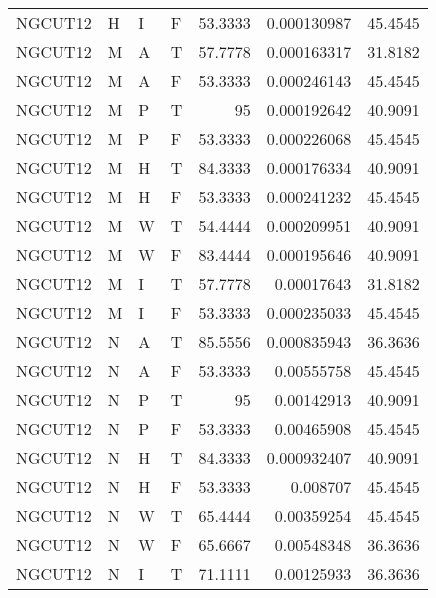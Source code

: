 \begin{longtable}{llllrrr}
    NGCUT12  & H         & I         & F          & 53.3333    & 0.000130987 & 45.4545  \\
    NGCUT12  & M         & A         & T          & 57.7778    & 0.000163317 & 31.8182  \\
    NGCUT12  & M         & A         & F          & 53.3333    & 0.000246143 & 45.4545  \\
    NGCUT12  & M         & P         & T          & 95         & 0.000192642 & 40.9091  \\
    NGCUT12  & M         & P         & F          & 53.3333    & 0.000226068 & 45.4545  \\
    NGCUT12  & M         & H         & T          & 84.3333    & 0.000176334 & 40.9091  \\
    NGCUT12  & M         & H         & F          & 53.3333    & 0.000241232 & 45.4545  \\
    NGCUT12  & M         & W         & T          & 54.4444    & 0.000209951 & 40.9091  \\
    NGCUT12  & M         & W         & F          & 83.4444    & 0.000195646 & 40.9091  \\
    NGCUT12  & M         & I         & T          & 57.7778    & 0.00017643  & 31.8182  \\
    NGCUT12  & M         & I         & F          & 53.3333    & 0.000235033 & 45.4545  \\
    NGCUT12  & N         & A         & T          & 85.5556    & 0.000835943 & 36.3636  \\
    NGCUT12  & N         & A         & F          & 53.3333    & 0.00555758  & 45.4545  \\
    NGCUT12  & N         & P         & T          & 95         & 0.00142913  & 40.9091  \\
    NGCUT12  & N         & P         & F          & 53.3333    & 0.00465908  & 45.4545  \\
    NGCUT12  & N         & H         & T          & 84.3333    & 0.000932407 & 40.9091  \\
    NGCUT12  & N         & H         & F          & 53.3333    & 0.008707    & 45.4545  \\
    NGCUT12  & N         & W         & T          & 65.4444    & 0.00359254  & 45.4545  \\
    NGCUT12  & N         & W         & F          & 65.6667    & 0.00548348  & 36.3636  \\
    NGCUT12  & N         & I         & T          & 71.1111    & 0.00125933  & 36.3636  \\

\end{longtable}
